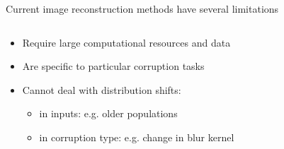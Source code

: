 \documentclass[8pt,xcolor=table,aspectratio=169]{beamer}
\begin{document}
\begin{frame}{Current image reconstruction methods have several limitations}


\begin{columns}
 \begin{column}{0.5\textwidth}

 \begin{itemize}
 \item Require large computational resources and data
 
 \vt
 
 \item Are specific to particular corruption tasks
 
 \vt 
 
 \item Cannot deal with distribution shifts:
 \begin{itemize}
   \item in inputs: e.g. older populations
   \item in corruption type: e.g. change in blur kernel
 \end{itemize}
 
  
 \end{itemize}

 \end{column}

 \begin{column}{0.5\textwidth}
  \centering
 \brgmprev  
  
 \end{column}
\end{columns} 

 
\end{frame}
\end{document}
